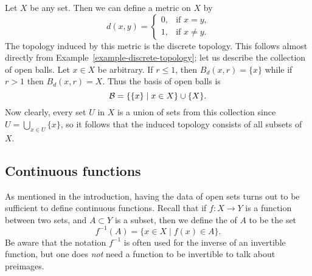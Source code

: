 \begin{example}
  Let $X$ be any set. Then we can define a metric on $X$ by
  \[
    d(x,y) = \begin{cases} 0, & \text{if $x = y$,} \\ 1, & \text{if $x \not= y$.} \end{cases}
  \]
  The topology induced by this metric is the discrete topology. This follows almost directly from Example~\ref{example-discrete-topology}; let us describe the collection of open balls. Let $x \in X$ be arbitrary. If $r \leq 1$, then $B_d(x,r) = \{x\}$ while if $r > 1$ then $B_d(x,r) = X$. Thus the basis of open balls is
  \[
    \mathcal{B} = \{ \{x \} \mid x \in X \} \cup \{X\}.
  \]
  Now clearly, every set $U$ in $X$ is a union of sets from this collection since $U = \bigcup_{x \in U} \{x\}$, so it follows that the induced topology consists of all subsets of $X$.
\end{example}


\subsection{Continuous functions}
As mentioned in the introduction, having the data of open sets turns out to be sufficient to define continuous functions. Recall that if $f : X \to Y$ is a function between two sets, and $A \subset Y$ is a subset, then we define the  of $A$ to be the set
\[
  f^{-1}(A) = \{ x \in X \mid f(x) \in A \}.
\]
Be aware that the notation $f^{-1}$ is often used for the inverse of an invertible function, but one does \emph{not} need a function to be invertible to talk about preimages.

